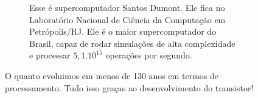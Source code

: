 \documentclass[12pt]{extarticle}
\newcommand{\<}{\langle}
\renewcommand{\>}{\rangle}
\theoremstyle{definition}
\begin{document}
\begin{figure}[H]
\begin{subfigure}[b]{0.45\textwidth}
         \caption{Esse é supercomputador Santos Dumont. Ele fica no Laboratório Nacional de Ciência da Computação em Petrópolis/RJ. Ele é o maior supercomputador do Brasil, capaz de rodar simulações de alta complexidade e processar $5,1.10^{15}$ operações por segundo.}
         \label{fig:santos_dumont}
     \end{subfigure}
     \caption{O quanto evoluimos em menos de 130 anos em termos de processamento. Tudo isso graças ao desenvolvimento do transistor!}
    \label{fig:lncc}
    
\end{figure}
\end{document}
